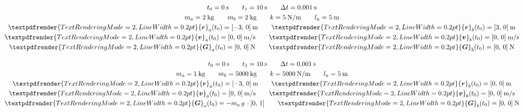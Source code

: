 \documentclass[a4paper,12pt,%
onecolumn,oneside,%
british%
]{memoir}
\renewcommand*{\bm}[1]{\textpdfrender{TextRenderingMode=2,LineWidth=0.2pt}{\boldsymbol{#1}}}
\newcommand*{\incr}{\Delta}%
\renewcommand*{\|}[1][]{\nonscript\:#1\vert\nonscript\:\mathopen{}}
\newcommand*{\yr}{\bm{r}}
\newcommand*{\yra}{\yr_{a}}
\newcommand*{\yrb}{\yr_{b}}
\newcommand*{\yv}{\bm{v}}
\newcommand*{\yva}{\yv_{a}}
\newcommand*{\yvb}{\yv_{b}}
\newcommand*{\ylo}{l_{\textrm{n}}}
\newcommand*{\yti}{t_{0}}
\newcommand*{\ytf}{t_{1}}
\newcommand*{\Dt}{\incr t}
\newcommand*{\yM}{m}%
\newcommand*{\yMa}{\yM_{a}}
\newcommand*{\yMb}{\yM_{b}}
\newcommand*{\yG}{\bm{G}}
\newcommand*{\yGa}{\yG_{a}}
\newcommand*{\yGb}{\yG_{b}}
\begin{document}
\begin{exercise}[label={ex:nonhooke}]
\begin{description}[itemsep=\baselineskip]
  \item[Set 2:]
        \begin{equation*}
      \begin{gathered}
        \yti=\qty{0}{s}
        \qquad
        \ytf=\qty{10}{s}
        \qquad
        \Dt = \qty{0.001}{s}
        \\
        \yMa=\qty{2}{kg}
        \qquad
        \yMb=\qty{2}{kg}
        \qquad
        k=\qty{5}{N/m}
        \qquad
        \ylo = \qty{5}{m}
        \\
        \yra(\yti)=[\num{-3},\, \num{0}]\:\unit{m}
        \qquad
        \yrb(\yti)=[\num{3},\, \num{0}]\:\unit{m}
        \\
        \yva(\yti)=[\num{0},\, \num{0}]\:\unit{m/s}
        \qquad
        \yvb(\yti)=[\num{0},\, \num{0}]\:\unit{m/s}
        \\
        \yGa(\yti)= [\num{0},\, \num{0}]\:\unit{N}
        \qquad
        \yGb(\yti)=[\num{0},\, \num{0}]\:\unit{N}
      \end{gathered}
    \end{equation*}

  \item[Set 3:]
        \begin{equation*}
      \begin{gathered}
        \yti=\qty{0}{s}
        \qquad
        \ytf=\qty{10}{s}
        \qquad
        \Dt = \qty{0.001}{s}
        \\
        \yMa=\qty{1}{kg}
        \qquad
        \yMb=\qty{5000}{kg}
        \qquad
        k=\qty{5000}{N/m}
        \qquad
        \ylo = \qty{5}{m}
        \\
        \yra(\yti)=[\num{-3},\, \num{0}]\:\unit{m}
        \qquad
        \yrb(\yti)=[\num{0},\, \num{0}]\:\unit{m}
        \\
        \yva(\yti)=[\num{0},\, \num{0}]\:\unit{m/s}
        \qquad
        \yvb(\yti)=[\num{0},\, \num{0}]\:\unit{m/s}
        \\
        \yGa(\yti)= -\yMa\,g\,\cdot[0,\, 1]
        \qquad
        \yGb(\yti)=[\num{0},\, \num{0}]\:\unit{N}
      \end{gathered}
    \end{equation*}


\end{description}
\end{exercise}
\end{document}
